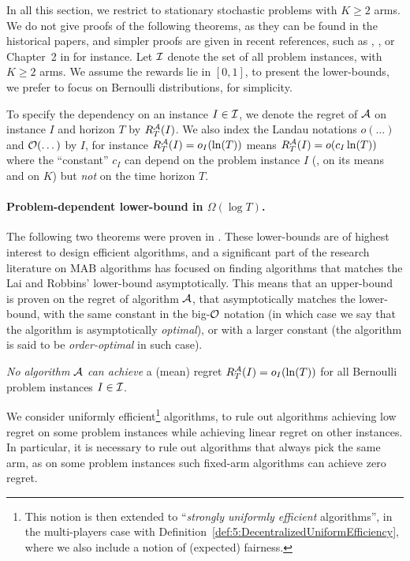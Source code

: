 In all this section, we restrict to stationary stochastic problems with $K\geq2$ arms.
We do not give proofs of the following theorems, as they can be found in the historical papers, and simpler proofs are given in recent references, such as \cite{Bubeck12}, \cite{LattimoreBanditAlgorithmsBook}, or Chapter~2 in \cite{Slivkins2019} for instance.
%
Let $\mathcal{I}$ denote the set of all problem instances, with $K \geq 2$ arms.
We assume the rewards lie in $[0,1]$,
to present the lower-bounds, we prefer to focus on Bernoulli distributions, for simplicity.

To specify the dependency on an instance $I\in\mathcal{I}$, we denote the regret of $\mathcal{A}$ on instance $I$ and horizon $T$ by $R_T^{\mathcal{A}}(I)$.
We also index the Landau notations $o(\dots)$ and $\mathop{}\mathopen{}\mathcal{O}\mathopen{}\left(\dots\right)$ by $I$,
for instance $R_T^{\mathcal{A}}(I) = o_I(\ln(T))$ means $R_T^{\mathcal{A}}(I) = \mathop{}\mathopen{}o\mathopen{}\left(c_I \ln(T)\right)$
where the ``constant'' $c_I$ can depend on the problem instance $I$ (\eg, on its means and on $K$) but \emph{not} on the time horizon $T$.


\paragraph{Problem-dependent lower-bound in $\Omega(\log T)$.}
%
The following two theorems were proven in \cite{LaiRobbins85}.
These lower-bounds are of highest interest to design efficient algorithms,
and a significant part of the research literature on MAB algorithms has focused on finding algorithms that matches the Lai and Robbins' lower-bound asymptotically.
This means that an upper-bound is proven on the regret of algorithm $\mathcal{A}$, that asymptotically matches the lower-bound, with the same constant in the big-$\mathcal{O}$ notation (in which case we say that the algorithm is asymptotically \emph{optimal}), or with a larger constant (the algorithm is said to be \emph{order-optimal} in such case).


\begin{theorem}\label{thm:2:firstLogTLowerBound}
\begin{leftbar}[theorembar]  %
    \emph{No algorithm $\mathcal{A}$ can achieve} a (mean) regret $R_T^{\mathcal{A}}(I) = o_I(\ln(T))$ for all Bernoulli problem instances $I \in \mathcal{I}$.
    \hfill{} \cite[Theorem~2.12]{Slivkins2019}
\end{leftbar}  %
\end{theorem}

We consider uniformly efficient\footnote{This notion is then extended to ``\emph{strongly uniformly efficient} algorithms'', in the multi-players case with Definition~\ref{def:5:DecentralizedUniformEfficiency}, where we also include a notion of (expected) fairness.} algorithms, to rule out algorithms achieving low regret on some problem instances while achieving linear regret on other instances.
In particular, it is necessary to rule out algorithms that always pick the same arm, as on some problem instances such fixed-arm algorithms can achieve zero regret.

